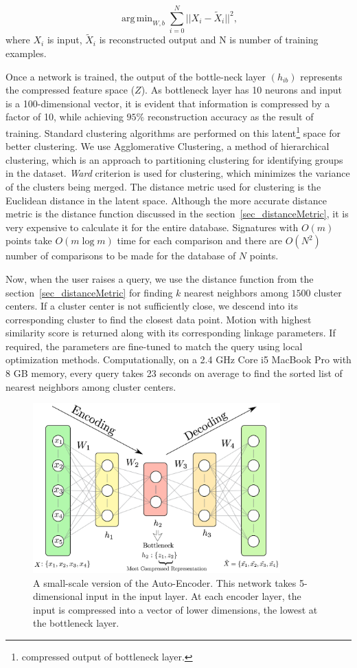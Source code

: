 \documentclass[twocolumn,10pt]{asme2ej}
\DeclareMathOperator*{\argminA}{arg\,min}
\begin{document}
\begin{equation}\label{nnloss}
  \argminA_{W, b} \sum_{i=0}^{N} || X_i - \tilde{X}_i ||^2,
\end{equation}
where $X_i$ is input, $\tilde{X}_i$ is reconstructed output and N is number of training examples.


Once a network is trained, the output of the bottle-neck layer $(h_{ib})$ represents the compressed feature space ($Z$).
As bottleneck layer has 10 neurons and input is a 100-dimensional vector, it is evident that information is compressed by a factor of 10, while achieving $95\%$ reconstruction accuracy as the result of training.
Standard clustering algorithms are performed on this latent\footnote{compressed output of bottleneck layer.} space for better clustering\cite{song2013}.
We use Agglomerative Clustering, a method of hierarchical clustering, which is an approach to partitioning clustering for identifying groups in the dataset.
\emph{Ward}\cite{ward1963} criterion is used for clustering, which minimizes the variance of the clusters being merged.
The distance metric used for clustering is the Euclidean distance in the latent space.
Although the more accurate distance metric is the distance function discussed in the section~\ref{sec_distanceMetric}, it is very expensive to calculate it for the entire database.
Signatures with ${O}(m)$ points take ${O}(m\log{}m)$ time for each comparison and there are ${O}(N^2)$ number of comparisons to be made for the database of $N$ points.

Now, when the user raises a query, we use the distance function from the section~\ref{sec_distanceMetric} for finding $k$ nearest neighbors among $1500$ cluster centers.
If a cluster center is not sufficiently close, we descend into its corresponding cluster to find the closest data point.
Motion with highest similarity score is returned along with its corresponding linkage parameters.
If required, the parameters are fine-tuned to match the query using local optimization methods.
Computationally, on a 2.4 GHz Core i5 MacBook Pro with 8 GB memory, every query takes 23 seconds on average to find the sorted list of nearest neighbors among cluster centers.

\begin{figure}
\centering
\includegraphics[width=270pt]{figure/fig_auto_encoder.eps}
  \caption{A small-scale version of the Auto-Encoder. This network takes 5-dimensional input in the input layer. At each encoder layer, the input is compressed into a vector of lower dimensions, the lowest at the bottleneck layer.}
\label{autoEncoder}
\end{figure}
\end{document}
